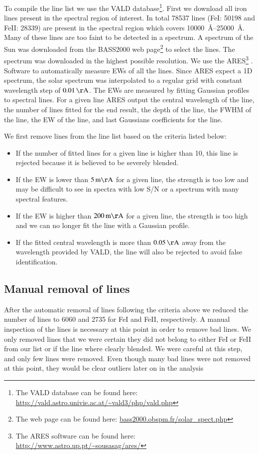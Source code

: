 \documentclass{aa}
\begin{document}
To compile the line list we use the VALD
database\footnote{The VALD database can be found here:
\url{http://vald.astro.univie.ac.at/~vald3/php/vald.php}}. First we
download all iron lines present in the spectral region of interest.
In total 78537 lines (FeI: 50198 and FeII: 28339) are present in the
spectral region which covers \SIrange{10000}{25000}{\angstrom}. Many of
these lines are too faint to be detected in a spectrum. A spectrum of the
Sun was downloaded from the BASS2000 web page\footnote{The web page can
be found here: \url{bass2000.obspm.fr/solar_spect.php}} to select the
lines. The spectrum was downloaded in the highest possible resolution.
We use the ARES\footnote{The ARES software can be found here:
\url{http://www.astro.up.pt/~sousasag/ares/}}\citep{Sousa2007,Sousa2015}
. Software to automatically measure EWs of all the lines. Since ARES
expect a 1D spectrum, the solar spectrum was interpolated to a regular
grid with constant wavelength step of $\SI{0.01}{\AA}$. The EWs are
measured by fitting Gaussian profiles to spectral lines. For a given
line ARES output the central wavelength of the line, the number of lines
fitted for the end result, the depth of the line, the FWHM of the line,
the EW of the line, and last Gaussians coefficients for the line.

We first remove lines from the line list based on the criteria listed
below:
\begin{itemize}
    \item If the number of fitted lines for a given line is higher than 10,
        this line is rejected because it is believed to be severely blended.
    \item If the EW is lower than $\SI{5}{m\AA}$ for a given line, the strength
        is too low and may be difficult to see in spectra with low S/N or a
        spectrum with many spectral features.
    \item If the EW is higher than $\SI{200}{m\AA}$ for a given line, the strength
        is too high and we can no longer fit the line with a Gaussian profile.
    \item If the fitted central wavelength is more than $\SI{0.05}{\AA}$ away
        from the wavelength provided by VALD, the line will also be rejected to
        avoid false identification.
\end{itemize}




\subsection{Manual removal of lines}
\label{sub:manual_removal_of_lines}
After the automatic removal of lines following the criteria above
we reduced the number of lines to 6060 and 2735 for FeI and FeII,
respectively. A manual inspection of the lines is necessary at this
point in order to remove bad lines. We only removed lines that we were
certain they did not belong to either FeI or FeII from our list or if
the line where clearly blended. We were careful at this step, and only
few lines were removed. Even though many bad lines were not removed at
this point, they would be clear outliers later on in the analysis
\end{document}
